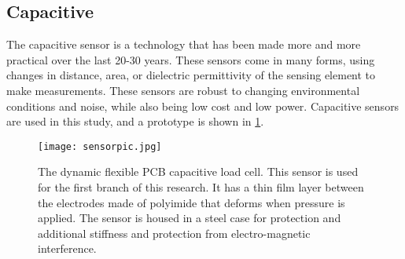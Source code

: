\subsection{Capacitive}

The capacitive sensor is a technology that has been made more and more practical over the last 20-30 years.
These sensors come in many forms, using changes in distance, area, or dielectric permittivity of the sensing element
to make measurements. These sensors are robust to changing environmental conditions and noise, 
while also being low cost and low power.
Capacitive sensors are used in this study, and a prototype is shown in \ref{fig:flexcell}.

\begin{figure}[ht]
\centering
\texttt{[image: sensorpic.jpg]}
\caption{The dynamic flexible PCB capacitive load cell. 
This sensor is used for the first branch of this research.
It has a thin film layer between the electrodes made of polyimide 
that deforms when pressure is applied. The sensor is housed in a steel case for
protection and additional stiffness and protection from electro-magnetic interference.
}
\label{fig:flexcell}
\end{figure}
